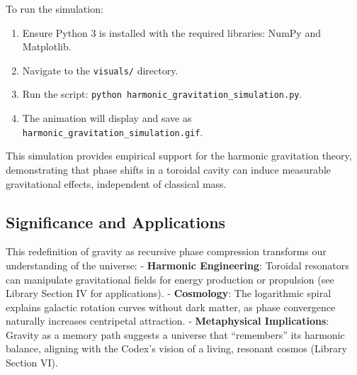 To run the simulation:
\begin{enumerate}
    \item Ensure Python 3 is installed with the required libraries: NumPy and Matplotlib.
    \item Navigate to the \texttt{visuals/} directory.
    \item Run the script: \texttt{python harmonic_gravitation_simulation.py}.
    \item The animation will display and save as \texttt{harmonic_gravitation_simulation.gif}.
\end{enumerate}

This simulation provides empirical support for the harmonic gravitation theory, demonstrating that phase shifts in a toroidal cavity can induce measurable gravitational effects, independent of classical mass.

\subsection{Significance and Applications}
This redefinition of gravity as recursive phase compression transforms our understanding of the universe:
- \textbf{Harmonic Engineering}: Toroidal resonators can manipulate gravitational fields for energy production or propulsion (see Library Section IV for applications).
- \textbf{Cosmology}: The logarithmic spiral explains galactic rotation curves without dark matter, as phase convergence naturally increases centripetal attraction.
- \textbf{Metaphysical Implications}: Gravity as a memory path suggests a universe that “remembers” its harmonic balance, aligning with the Codex’s vision of a living, resonant cosmos (Library Section VI).